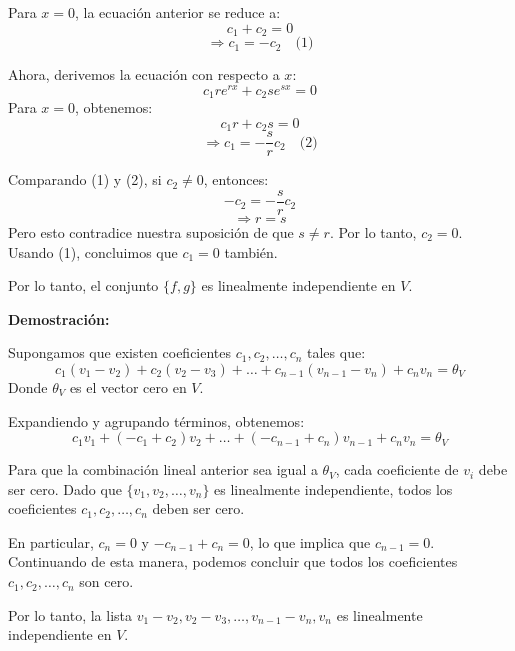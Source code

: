 \documentclass{article}
\begin{document}
Para \( x = 0 \), la ecuación anterior se reduce a:
\[ c_1 + c_2 = 0 \]
\[ \Rightarrow c_1 = -c_2 \quad \text{(1)} \]

Ahora, derivemos la ecuación con respecto a \( x \):
\[ c_1 r e^{rx} + c_2 s e^{sx} = 0 \]
Para \( x = 0 \), obtenemos:
\[ c_1 r + c_2 s = 0 \]
\[ \Rightarrow c_1 = -\frac{s}{r} c_2 \quad \text{(2)} \]

Comparando (1) y (2), si \( c_2 \neq 0 \), entonces:
\[ -c_2 = -\frac{s}{r} c_2 \]
\[ \Rightarrow r = s \]
Pero esto contradice nuestra suposición de que \( s \neq r \). Por lo tanto, \( c_2 = 0 \). Usando (1), concluimos que \( c_1 = 0 \) también.

Por lo tanto, el conjunto \( \{f, g\} \) es linealmente independiente en \( V \).


\begin{center}
\end{center}

\textbf{Demostración:}

Supongamos que existen coeficientes \( c_1, c_2, \ldots, c_n \) tales que:
\[ c_1(v_1-v_2) + c_2(v_2-v_3) + \ldots + c_{n-1}(v_{n-1}-v_n) + c_n v_n = \theta_V \]
Donde \( \theta_V \) es el vector cero en \( V \).

Expandiendo y agrupando términos, obtenemos:
\[ c_1 v_1 + (-c_1 + c_2) v_2 + \ldots + (-c_{n-1} + c_n) v_{n-1} + c_n v_n = \theta_V \]

Para que la combinación lineal anterior sea igual a \( \theta_V \), cada coeficiente de \( v_i \) debe ser cero. Dado que \( \{v_1, v_2, \ldots, v_n\} \) es linealmente independiente, todos los coeficientes \( c_1, c_2, \ldots, c_n \) deben ser cero.

En particular, \( c_n = 0 \) y \( -c_{n-1} + c_n = 0 \), lo que implica que \( c_{n-1} = 0 \). Continuando de esta manera, podemos concluir que todos los coeficientes \( c_1, c_2, \ldots, c_n \) son cero.

Por lo tanto, la lista \( v_1-v_2, v_2-v_3, \ldots, v_{n-1}-v_n, v_n \) es linealmente independiente en \( V \).
\end{document}
